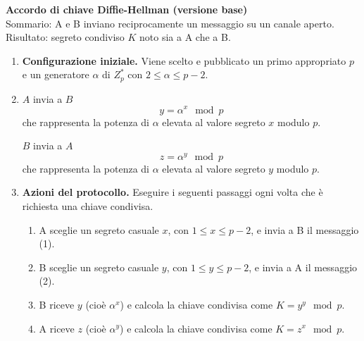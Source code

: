 \documentclass{article}
\theoremstyle{definition}
\begin{document}
\begin{mdframed}
\begin{center}
    \vspace{10pt}
    \textbf{Accordo di chiave Diffie-Hellman (versione base)} \\
    Sommario: A e B inviano reciprocamente un messaggio su un canale aperto. \\
   Risultato: segreto condiviso \( K \) noto sia a A che a B.
    \vspace{10pt}
\end{center} 

\begin{enumerate}
    \item \textbf{Configurazione iniziale.} Viene scelto e pubblicato un primo appropriato \( p \) e un generatore \( \alpha \) di \( Z^*_p \) con \( 2 \leq \alpha \leq p - 2 \).
    
    \item \(A\) invia a \(B\)
    \begin{equation}\tag{1}\label{eq:protocol_msg_1}
        y = \alpha^x \mod p
    \end{equation}
    che rappresenta la potenza di \( \alpha \) elevata al valore segreto \( x \) modulo \( p \).
    
    \(B\) invia a \(A\)
    \begin{equation}\tag{2}\label{eq:protocol_msg_2}
        z = \alpha^y \mod p
    \end{equation}
    che rappresenta la potenza di \( \alpha \) elevata al valore segreto \( y \) modulo \( p \).
    
    \item \textbf{Azioni del protocollo.} Eseguire i seguenti passaggi ogni volta che è richiesta una chiave condivisa.
    \begin{enumerate}
        \item A sceglie un segreto casuale \( x \), con \( 1 \leq x \leq p - 2 \), e invia a B il messaggio (1).
        \item B sceglie un segreto casuale \( y \), con \( 1 \leq y \leq p - 2 \), e invia a A il messaggio (2).
        \item B riceve \( y \) (cioè \( \alpha^x \)) e calcola la chiave condivisa come \( K = y^y \mod p \).
        \item A riceve \( z \) (cioè \( \alpha^y \)) e calcola la chiave condivisa come \( K = z^x \mod p \).
    \end{enumerate}
\end{enumerate}
\end{mdframed}
\end{document}
